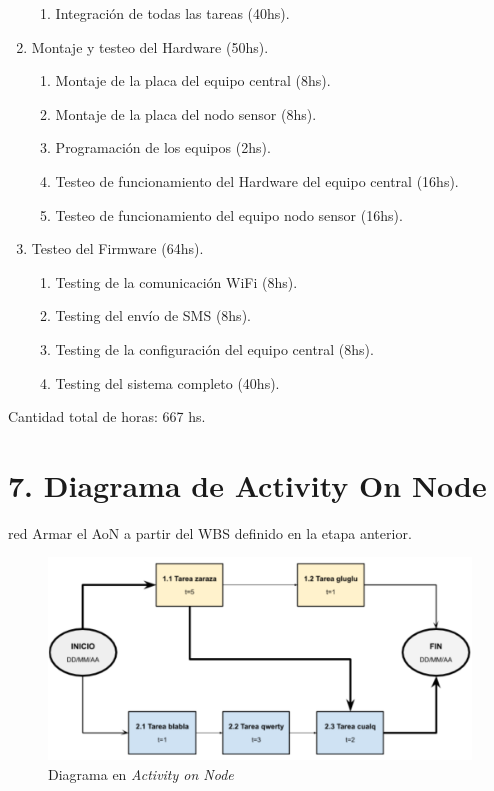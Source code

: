 \documentclass[11pt]{charter}
\begin{document}
\begin{enumerate}
\begin{enumerate}
	\item Integración de todas las tareas (40hs).
	\end{enumerate}
\item Montaje y testeo del Hardware (50hs).
	\begin{enumerate}
	\item Montaje de la placa del equipo central (8hs).
	\item Montaje de la placa del nodo sensor (8hs).
	\item Programación de los equipos (2hs).
	\item Testeo de funcionamiento del Hardware del equipo central (16hs).
	\item Testeo de funcionamiento del equipo nodo sensor (16hs).
	\end{enumerate}
\item Testeo del Firmware (64hs).
	\begin{enumerate}
	\item Testing de la comunicación WiFi (8hs).
	\item Testing del envío de SMS (8hs).
	\item Testing de la configuración del equipo central (8hs).
	\item Testing del sistema completo (40hs).
	\end{enumerate}
\end{enumerate}

Cantidad total de horas: 667 hs.

\section{7. Diagrama de Activity On Node}
\label{sec:AoN}

\begin{consigna}{red}
Armar el AoN a partir del WBS definido en la etapa anterior. 



\end{consigna}

\begin{figure}[htpb]
\centering 
\includegraphics[width=.8\textwidth]{./Figuras/AoN.png}
\caption{Diagrama en \textit{Activity on Node}}
\label{fig:AoN}
\end{figure}
\end{document}

